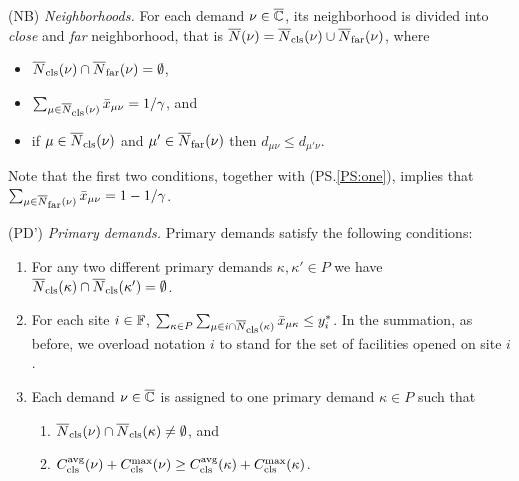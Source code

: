 \begin{description}
	
      \renewcommand{\theenumii}{(\alph{enumii})}
      \renewcommand{\labelenumii}{\theenumii}

\item{(NB)} \label{NB}
	\emph{Neighborhoods.}
	For each demand $\nu \in \overline{\mathbb{C}}$, its neighborhood is divided into \emph{close} and
	\emph{far} neighborhood, that is ${\overline{N}}(\nu) = {\overline{N}}_{{\mbox{\scriptsize\rm cls}}}(\nu) \cup {\overline{N}}_{{\mbox{\scriptsize\rm far}}}(\nu)$, where
	\begin{itemize}
	\item ${\overline{N}}_{{\mbox{\scriptsize\rm cls}}}(\nu) \cap {\overline{N}}_{{\mbox{\scriptsize\rm far}}}(\nu) = \emptyset$,
	\item $\sum_{\mu\in{\overline{N}}_{{\mbox{\scriptsize\rm cls}}}(\nu)} {\bar x}_{\mu\nu} =1/\gamma$, and 
	\item if $\mu\in {\overline{N}}_{{\mbox{\scriptsize\rm cls}}}(\nu)$ and $\mu'\in {\overline{N}}_{{\mbox{\scriptsize\rm far}}}(\nu)$ 
				then $d_{\mu\nu}\le d_{\mu'\nu}$.   
	\end{itemize}
	Note that the first two conditions, together with
        (PS.\ref{PS:one}), implies that $\sum_{\mu\in{\overline{N}}_{{\mbox{\scriptsize\rm far}}}(\nu)}
        {\bar x}_{\mu\nu} =1-1/\gamma$.

\item{(PD')} \emph{Primary demands.}
	Primary demands satisfy the following conditions:

	\begin{enumerate}
		
	\item\label{PD1:disjoint}  For any two different primary demands $\kappa,\kappa'\in P$ we have
				${\overline{N}}_{{\mbox{\scriptsize\rm cls}}}(\kappa)\cap {\overline{N}}_{{\mbox{\scriptsize\rm cls}}}(\kappa') = \emptyset$.

	\item \label{PD1:yi} For each site $i\in\mathbb{F}$, 
		$ \sum_{\kappa\in P}\sum_{\mu\in
                  i\cap{\overline{N}}_{{\mbox{\scriptsize\rm cls}}}(\kappa)}{\bar x}_{\mu\kappa} \leq
                y_i^\ast$. In the summation, as before, we overload notation $i$ to stand for the set of
						facilities opened on site $i$.
		
	\item \label{PD1:assign} Each demand $\nu\in\overline{\mathbb{C}}$ is assigned
        to one primary demand $\kappa\in P$ such that

  			\begin{enumerate}
	
				\item \label{PD1:assign:overlap} ${\overline{N}}_{{\mbox{\scriptsize\rm cls}}}(\nu) \cap {\overline{N}}_{{\mbox{\scriptsize\rm cls}}}(\kappa) \neq \emptyset$, and
				\item \label{PD1:assign:cost}
          $C_{{\mbox{\scriptsize\rm cls}}}^{{\mbox{\scriptsize\rm avg}}}(\nu)+C_{{\mbox{\scriptsize\rm cls}}}^{\max}(\nu) \geq
          C_{{\mbox{\scriptsize\rm cls}}}^{{\mbox{\scriptsize\rm avg}}}(\kappa)+C_{{\mbox{\scriptsize\rm cls}}}^{\max}(\kappa)$.
			\end{enumerate}


\end{enumerate}
\end{description}
